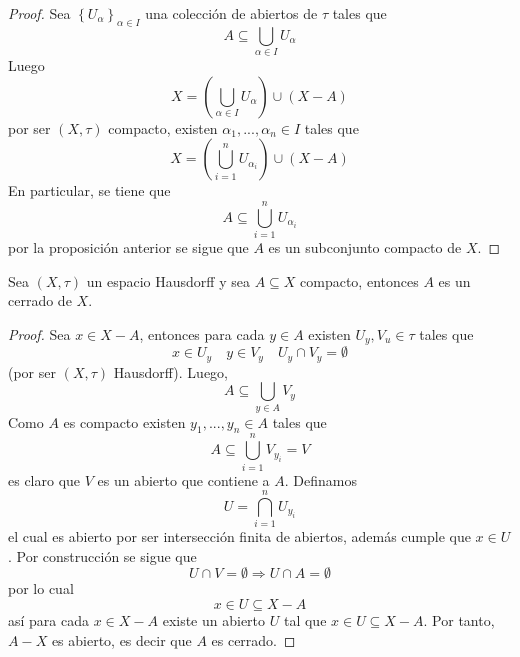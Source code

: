 \documentclass[12pt]{report}
\theoremstyle{largebreak}
\begin{document}
    \begin{proof}
        Sea $\left\{U_\alpha \right\}_{\alpha\in I}$ una colección de abiertos de $\tau$ tales que
        \begin{equation*}
            A\subseteq\bigcup_{\alpha\in I}U_\alpha
        \end{equation*}
        Luego
        \begin{equation*}
            X=\left(\bigcup_{\alpha\in I}U_\alpha\right)\cup(X-A) 
        \end{equation*}
        por ser $(X,\tau)$ compacto, existen $\alpha_1,...,\alpha_n\in I$ tales que
        \begin{equation*}
            X=\left(\bigcup_{ i =1}^n U_{\alpha_i}\right)\cup(X-A)
        \end{equation*}
        En particular, se tiene que
        \begin{equation*}
            A\subseteq\bigcup_{ i =1}^n U_{\alpha_i}
        \end{equation*}
        por la proposición anterior se sigue que $A$ es un subconjunto compacto de $X$.
    \end{proof}

    \begin{propo}
        Sea $(X,\tau)$ un espacio Hausdorff y sea $A\subseteq X$ compacto, entonces $A$ es un cerrado de $X$.
    \end{propo}

    \begin{proof}
        Sea $x\in X-A$, entonces para cada $y\in A$ existen $U_y,V_u\in\tau$ tales que 
        \begin{equation*}
            x\in U_y\quad y\in V_y\quad U_y\cap V_y=\emptyset
        \end{equation*}
        (por ser $(X,\tau)$ Hausdorff). Luego,
        \begin{equation*}
            A\subseteq\bigcup_{ y\in A}V_y
        \end{equation*}
        Como $A$ es compacto existen $y_1,...,y_n\in A$ tales que
        \begin{equation*}
            A\subseteq\bigcup_{ i=1}^n V_{ y_i}=V
        \end{equation*}
        es claro que $V$ es un abierto que contiene a $A$. Definamos
        \begin{equation*}
            U=\bigcap_{ i =1}^n U_{ y_i}
        \end{equation*}
        el cual es abierto por ser intersección finita de abiertos, además cumple que $x\in U$. Por construcción se sigue que
        \begin{equation*}
            U\cap V=\emptyset\Rightarrow U\cap A=\emptyset
        \end{equation*}
        por lo cual
        \begin{equation*}
            x\in U\subseteq X-A
        \end{equation*}
        así para cada $x\in X-A$ existe un abierto $U$ tal que $x\in U\subseteq X-A$. Por tanto, $A-X$ es abierto, es decir que $A$ es cerrado.
    \end{proof}
\end{document}
